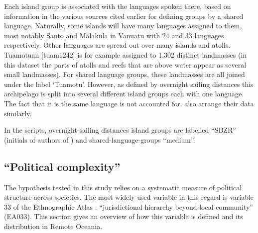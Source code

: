 \documentclass[unnumsec,webpdf,modern,medium]{oup-authoring-template}
\begin{document}
\begin{appendices}

Each island group is associated with the languages spoken there, based on information in the various sources cited earlier for defining groups by a shared language. Naturally, some islands will have many languages assigned to them, most notably Santo and Malakula in Vanuatu with 24 and 33 languages respectively. Other languages are spread out over many islands and atolls. Tuamotuan [tuam1242] is for example assigned to 1,302 distinct landmasses (in this dataset the parts of atolls and reefs that are above water appear as several small landmasses). For shared language groups, these landmasses are all joined under the label `Tuamotu'. However, as defined by overnight sailing distances this archipelago is split into several different island groups each with one language. The fact that it is the same language is not accounted for. \citet{gavin2012island} also arrange their data similarly.

In the scripts, overnight-sailing distances island groups are labelled ``SBZR'' (initials of authors of \cite{NZSA_overnight_2023}) and shared-language-groups ``medium''.

\FloatBarrier
\subsection{``Political complexity''}
\label{appendix_def_pol_complex}
The hypothesis tested in this study relies on a systematic measure of political structure across societies. The most widely used variable in this regard is variable 33 of the Ethnographic Atlas \citep{EA_1971}: ``jurisdictional hierarchy beyond local community'' (EA033). This section gives an overview of how this variable is defined and its distribution in Remote Oceania. 


\end{appendices}
\end{document}
